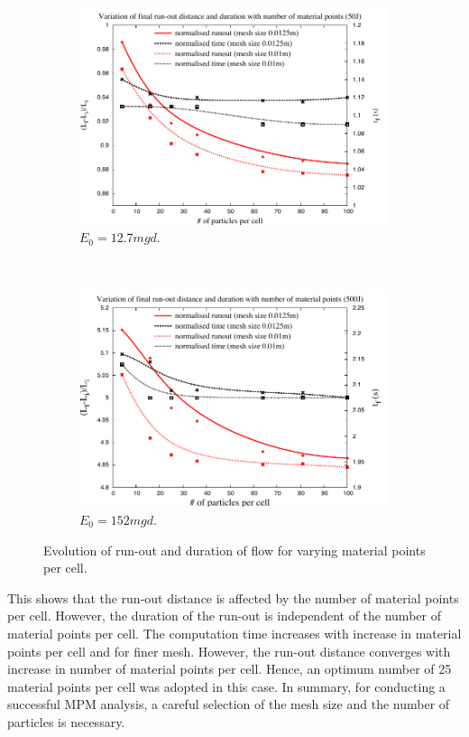 \begin{figure}[tbhp]
\centering
\begin{subfigure}[b]{0.95\textwidth}
\includegraphics[width=\textwidth]{50}
\caption{$E_0=12.7mgd$.}
\label{fig:50}
\end{subfigure}
\\
\begin{subfigure}[b]{0.95\textwidth}
\centering
\includegraphics[width=\textwidth]{500}
\caption{$E_0=152mgd$.}
\label{fig:500}
\end{subfigure}
\caption{Evolution of run-out and duration of flow  for varying material points 
per cell.}
\label{fig:MPM_Size_Effect}
\end{figure}

This shows that the run-out distance is affected by the number of material 
points per cell. However, the duration of the run-out is independent of the 
number of material points per cell. The computation time increases with 
increase in material points per cell and for finer mesh. However, the run-out 
distance converges with increase in number of material points per cell. Hence, 
an optimum number of 25 material points per cell was adopted in this case. In 
summary, for conducting a successful MPM analysis, a careful selection of the 
mesh size and the number of particles is necessary.

